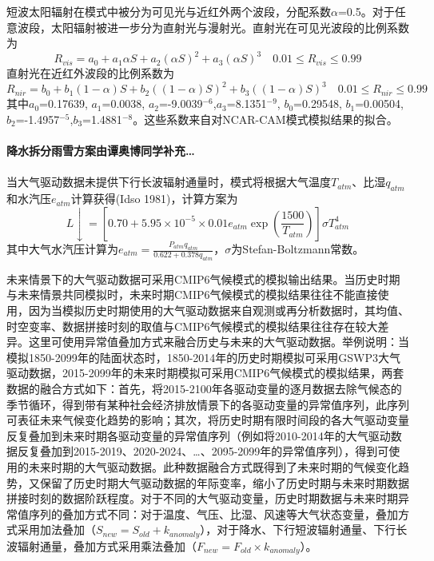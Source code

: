 短波太阳辐射在模式中被分为可见光与近红外两个波段，分配系数$\alpha$=0.5。对于任意波段，太阳辐射被进一步分为直射光与漫射光。直射光在可见光波段的比例系数为
\begin{equation}\label{R_vis}
R_{vis}=a_{0}+a_{1} \alpha S+a_{2}(\alpha S)^{2}+a_{3}(\alpha S)^{3} \quad 0.01 \leq R_{vis} \leq 0.99
\end{equation}
直射光在近红外波段的比例系数为
\begin{equation}
R_{nir}=b_{0}+b_{1}(1-\alpha) S+b_{2}((1-\alpha) S)^{2}+b_{3}((1-\alpha) S)^{3} \quad 0.01 \leq R_{nir} \leq 0.99
\end{equation}
其中$a_0$=0.17639, $a_1$=0.0038, $a_2$=-9.0039$^{-6}$,$a_3$=8.1351$^{-9}$, $b_0$=0.29548, $b_1$=0.00504, $b_2$=-1.4957$^{-5}$,$b_3$=1.4881$^{-8}$。这些系数来自对NCAR-CAM模式模拟结果的拟合。
\\
\\
\textbf{降水拆分雨雪方案由谭奥博同学补充…}
\\
\\

当大气驱动数据未提供下行长波辐射通量时，模式将根据大气温度$T_{atm}$、比湿$q_{atm}$和水汽压$e_{atm}$计算获得(Idso 1981)，计算方案为
\begin{equation}\label{L_downarrow}
L \downarrow=\left[0.70+5.95 \times 10^{-5} \times 0.01 e_{a t m} \exp \left(\frac{1500}{T_{a t m}}\right)\right] \sigma T_{a t m}^{4}
\end{equation}
其中大气水汽压计算为$e_{a t m}=\frac{P_{a t m} q_{a t m}}{0.622+0.378 q_{a t m}}$，$\sigma$为Stefan-Boltzmann常数。

未来情景下的大气驱动数据可采用CMIP6气候模式的模拟输出结果。当历史时期与未来情景共同模拟时，未来时期CMIP6气候模式的模拟结果往往不能直接使用，因为当模拟历史时期使用的大气驱动数据来自观测或再分析数据时，其均值、时空变率、数据拼接时刻的取值与CMIP6气候模式的模拟结果往往存在较大差异。这里可使用异常值叠加方式来融合历史与未来的大气驱动数据。举例说明：当模拟1850-2099年的陆面状态时，1850-2014年的历史时期模拟可采用GSWP3大气驱动数据，2015-2099年的未来时期模拟可采用CMIP6气候模式的模拟结果，两套数据的融合方式如下：首先，将2015-2100年各驱动变量的逐月数据去除气候态的季节循环，得到带有某种社会经济排放情景下的各驱动变量的异常值序列，此序列可表征未来气候变化趋势的影响；其次，将历史时期有限时间段的各大气驱动变量反复叠加到未来时期各驱动变量的异常值序列（例如将2010-2014年的大气驱动数据反复叠加到2015-2019、2020-2024、…、2095-2099年的异常值序列），得到可使用的未来时期的大气驱动数据。此种数据融合方式既得到了未来时期的气候变化趋势，又保留了历史时期大气驱动数据的年际变率，缩小了历史时期与未来时期数据拼接时刻的数据阶跃程度。对于不同的大气驱动变量，历史时期数据与未来时期异常值序列的叠加方式不同：对于温度、气压、比湿、风速等大气状态变量，叠加方式采用加法叠加（$S_{new}=S_{old}+k_{anomaly}$），对于降水、下行短波辐射通量、下行长波辐射通量，叠加方式采用乘法叠加（$F_{new}=F_{old}\times k_{anomaly}$）。


